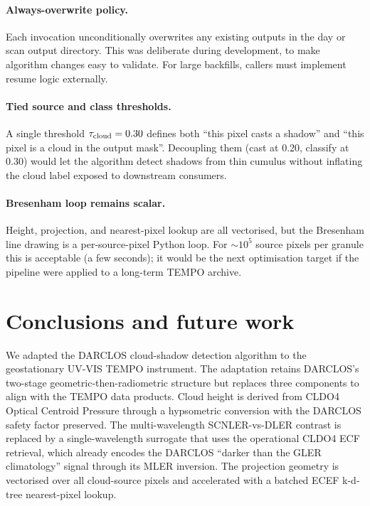 \documentclass[11pt,a4paper]{article}
\begin{document}
\paragraph{Always-overwrite policy.}
Each invocation unconditionally overwrites any existing outputs in the
day or scan output directory. This was deliberate during development,
to make algorithm changes easy to validate. For large backfills,
callers must implement resume logic externally.

\paragraph{Tied source and class thresholds.}
A single threshold $\tau_{\rm cloud} = 0.30$ defines both ``this pixel
casts a shadow'' and ``this pixel is a cloud in the output mask''.
Decoupling them (cast at 0.20, classify at 0.30) would let the algorithm
detect shadows from thin cumulus without inflating the cloud label
exposed to downstream consumers.

\paragraph{Bresenham loop remains scalar.}
Height, projection, and nearest-pixel lookup are all vectorised, but
the Bresenham line drawing is a per-source-pixel Python loop. For
$\sim 10^5$ source pixels per granule this is acceptable (a few
seconds); it would be the next optimisation target if the pipeline
were applied to a long-term TEMPO archive.

\section{Conclusions and future work}\label{sec:conclusions}

We adapted the DARCLOS cloud-shadow detection algorithm
\citep{trees2022darclos} to the geostationary UV-VIS TEMPO instrument.
The adaptation retains DARCLOS's two-stage geometric-then-radiometric
structure but replaces three components to align with the TEMPO data
products. Cloud height is derived from CLDO4 Optical Centroid Pressure
through a hypsometric conversion with the DARCLOS safety factor
preserved. The multi-wavelength SCNLER-vs-DLER contrast is replaced by
a single-wavelength surrogate that uses the operational CLDO4 ECF
retrieval, which already encodes the DARCLOS ``darker than the GLER
climatology'' signal through its MLER inversion. The projection geometry
is vectorised over all cloud-source pixels and accelerated with a
batched ECEF k-d-tree nearest-pixel lookup.
\end{document}
